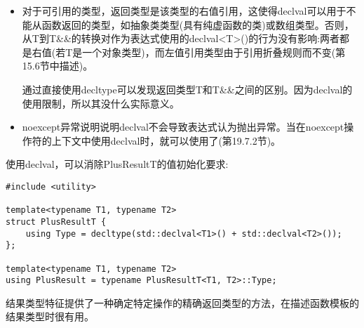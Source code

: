 \begin{itemize}
\item 
对于可引用的类型，返回类型是该类型的右值引用，这使得declval可以用于不能从函数返回的类型，如抽象类类型(具有纯虚函数的类)或数组类型。否则，从T到T\&\&的转换对作为表达式使用的declval<T>()的行为没有影响:两者都是右值(若T是一个对象类型)，而左值引用类型由于引用折叠规则而不变(第15.6节中描述)。

\begin{tcolorbox}[colback=webgreen!5!white,colframe=webgreen!75!black]
\hspace*{0.75cm}通过直接使用decltype可以发现返回类型T和T\&\&之间的区别。因为declval的使用限制，所以其没什么实际意义。
\end{tcolorbox}

\item 
noexcept异常说明说明declval不会导致表达式认为抛出异常。当在noexcept操作符的上下文中使用declval时，就可以使用了(第19.7.2节)。
\end{itemize}

使用declval，可以消除PlusResultT的值初始化要求:

\begin{lstlisting}[style=styleCXX]
#include <utility>

template<typename T1, typename T2>
struct PlusResultT {
	using Type = decltype(std::declval<T1>() + std::declval<T2>());
};

template<typename T1, typename T2>
using PlusResult = typename PlusResultT<T1, T2>::Type;
\end{lstlisting}

结果类型特征提供了一种确定特定操作的精确返回类型的方法，在描述函数模板的结果类型时很有用。




















